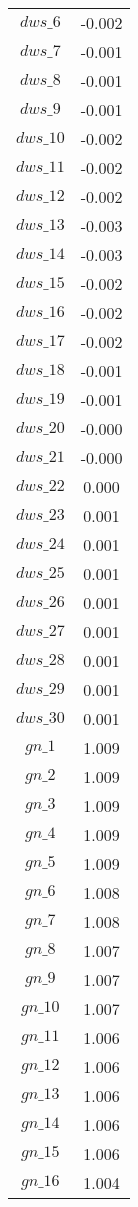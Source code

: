 \begin{center}
\begin{longtable}{cc}
$dws\_6$ 	 & 	 -0.002 \\
$dws\_7$ 	 & 	 -0.001 \\
$dws\_8$ 	 & 	 -0.001 \\
$dws\_9$ 	 & 	 -0.001 \\
$dws\_10$ 	 & 	 -0.002 \\
$dws\_11$ 	 & 	 -0.002 \\
$dws\_12$ 	 & 	 -0.002 \\
$dws\_13$ 	 & 	 -0.003 \\
$dws\_14$ 	 & 	 -0.003 \\
$dws\_15$ 	 & 	 -0.002 \\
$dws\_16$ 	 & 	 -0.002 \\
$dws\_17$ 	 & 	 -0.002 \\
$dws\_18$ 	 & 	 -0.001 \\
$dws\_19$ 	 & 	 -0.001 \\
$dws\_20$ 	 & 	 -0.000 \\
$dws\_21$ 	 & 	 -0.000 \\
$dws\_22$ 	 & 	 0.000 \\
$dws\_23$ 	 & 	 0.001 \\
$dws\_24$ 	 & 	 0.001 \\
$dws\_25$ 	 & 	 0.001 \\
$dws\_26$ 	 & 	 0.001 \\
$dws\_27$ 	 & 	 0.001 \\
$dws\_28$ 	 & 	 0.001 \\
$dws\_29$ 	 & 	 0.001 \\
$dws\_30$ 	 & 	 0.001 \\
$gn\_1$ 	 & 	 1.009 \\
$gn\_2$ 	 & 	 1.009 \\
$gn\_3$ 	 & 	 1.009 \\
$gn\_4$ 	 & 	 1.009 \\
$gn\_5$ 	 & 	 1.009 \\
$gn\_6$ 	 & 	 1.008 \\
$gn\_7$ 	 & 	 1.008 \\
$gn\_8$ 	 & 	 1.007 \\
$gn\_9$ 	 & 	 1.007 \\
$gn\_10$ 	 & 	 1.007 \\
$gn\_11$ 	 & 	 1.006 \\
$gn\_12$ 	 & 	 1.006 \\
$gn\_13$ 	 & 	 1.006 \\
$gn\_14$ 	 & 	 1.006 \\
$gn\_15$ 	 & 	 1.006 \\
$gn\_16$ 	 & 	 1.004 \\

\end{longtable}
\end{center}
